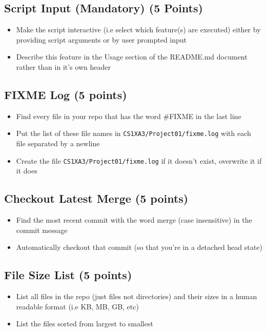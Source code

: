 \documentclass[11pt]{article}
\begin{document}
\subsection{Script Input (\textbf{Mandatory}) (5 Points)}
\label{sec:org62b50a9}
\begin{itemize}
\item Make the script interactive (i.e select which feature(s) are executed)
either by providing script arguments or by user prompted input
\item Describe this feature in the {\color{purple}Usage} section of the {\color{purple}README.md} document
rather than in it's own header
\end{itemize}
\subsection{FIXME Log (5 points)}
\label{sec:orga92bccc}
\begin{itemize}
\item Find every file in your repo that has the word {\color{purple}\#FIXME} in the last line
\item Put the list of these file names in  \texttt{CS1XA3/Project01/fixme.log} with each file separated by a newline
\item Create the file \texttt{CS1XA3/Project01/fixme.log} if it doesn't exist, overwrite
it if it does
\end{itemize}
\subsection{Checkout Latest Merge (5 points)}
\label{sec:orgd7b2bcd}
\begin{itemize}
\item Find the most recent commit with the word {\color{purple}merge} (case
insensitive) in the commit message
\item Automatically checkout that commit (so that you're in a detached head
state)
\end{itemize}
\subsection{File Size List (5 points)}
\label{sec:orgef589fb}
\begin{itemize}
\item List all files in the repo (just files not directories) and their sizes in
a human readable format (i.e KB, MB, GB, etc)
\item List the files sorted from largest to smallest
\end{itemize}
\end{document}
